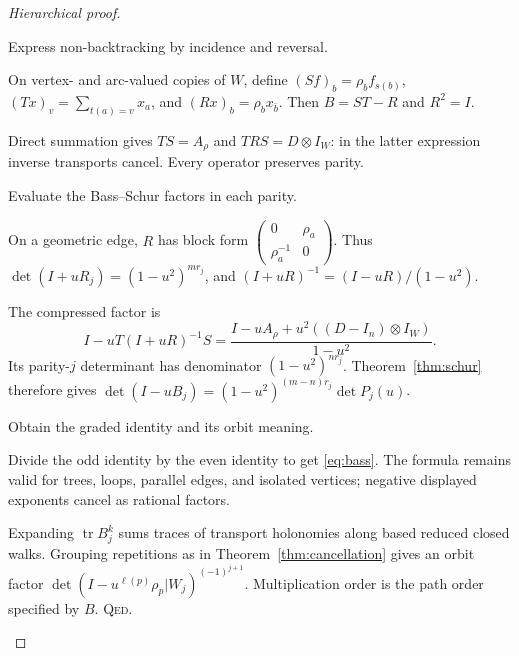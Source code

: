 \documentclass[11pt,a4paper]{article}
\theoremstyle{remark}\newtheorem{remark}[definition]{Remark}
\newcommand{\tr}{\operatorname{tr}}\newcommand{\im}{\operatorname{im}}
\newcommand{\QED}{\textsc{Qed}}
\begin{document}
\begin{proof}[Hierarchical proof]
\begin{steps}
\item Express non-backtracking by incidence and reversal.
\begin{steps}
\item On vertex- and arc-valued copies of $W$, define $(Sf)_b=\rho_bf_{s(b)}$, $(Tx)_v=\sum_{t(a)=v}x_a$, and $(Rx)_b=\rho_bx_{\bar b}$. Then $B=ST-R$ and $R^2=I$.
\item Direct summation gives $TS=A_\rho$ and $TRS=D\otimes I_W$: in the latter expression inverse transports cancel. Every operator preserves parity.
\end{steps}
\item Evaluate the Bass--Schur factors in each parity.
\begin{steps}
\item On a geometric edge, $R$ has block form $\left(\begin{smallmatrix}0&\rho_a\\\rho_a^{-1}&0\end{smallmatrix}\right)$. Thus $\det(I+uR_j)=(1-u^2)^{mr_j}$, and $(I+uR)^{-1}=(I-uR)/(1-u^2)$.
\item The compressed factor is
\[
I-uT(I+uR)^{-1}S
=\frac{I-uA_\rho+u^2((D-I_n)\otimes I_W)}{1-u^2}.
\]
Its parity-$j$ determinant has denominator $(1-u^2)^{nr_j}$. Theorem~\ref{thm:schur} therefore gives $\det(I-uB_j)=(1-u^2)^{(m-n)r_j}\det P_j(u)$.
\end{steps}
\item Obtain the graded identity and its orbit meaning.
\begin{steps}
\item Divide the odd identity by the even identity to get \eqref{eq:bass}. The formula remains valid for trees, loops, parallel edges, and isolated vertices; negative displayed exponents cancel as rational factors.
\item Expanding $\tr B_j^k$ sums traces of transport holonomies along based reduced closed walks. Grouping repetitions as in Theorem~\ref{thm:cancellation} gives an orbit factor $\det(I-u^{\ell(p)}\rho_p|W_j)^{(-1)^{j+1}}$. Multiplication order is the path order specified by $B$. \QED.
\end{steps}
\end{steps}
\end{proof}
\end{document}
